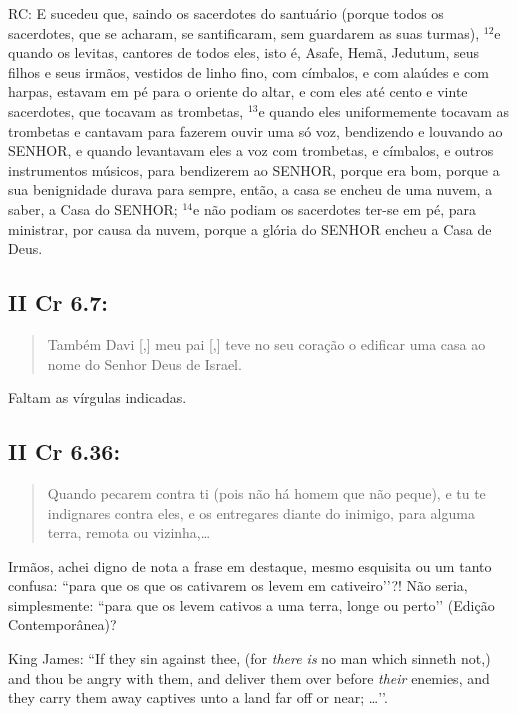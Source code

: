 RC: E sucedeu que, saindo os sacerdotes do santuário (porque todos os
sacerdotes, que se acharam, se santificaram, sem guardarem as suas
turmas), $^{\mathrm{12}}$e quando os levitas, cantores de todos eles,
isto é, Asafe, Hemã, Jedutum, seus filhos e seus irmãos, vestidos de
linho fino, com címbalos, e com alaúdes e com harpas, estavam em pé
para o oriente do altar, e com eles até cento e vinte sacerdotes, que
tocavam as trombetas, $^{\mathrm{13}}$e quando eles uniformemente
tocavam as trombetas e cantavam para fazerem ouvir uma só voz,
bendizendo e louvando ao SENHOR, e quando levantavam eles a voz com
trombetas, e címbalos, e outros instrumentos músicos, para bendizerem
ao SENHOR, porque era bom, porque a sua benignidade durava para
sempre, então, a casa se encheu de uma nuvem, a saber, a Casa do
SENHOR; $^{\mathrm{14}}$e não podiam os sacerdotes ter-se em pé, para
ministrar, por causa da nuvem, porque a glória do SENHOR encheu a Casa
de Deus.

\subsection{II Cr 6.7:}
\begin{quote}
    \small
 Também Davi [,] meu pai [,] teve no seu coração o edificar uma casa ao nome do Senhor Deus de Israel.
 \end{quote}
 
Faltam as vírgulas indicadas.

\subsection{II Cr 6.36:}
\begin{quote}
    \small
 Quando pecarem contra ti (pois não há homem que não peque), e tu te indignares contra eles, e os entregares diante do inimigo,  para alguma terra, remota ou vizinha,\ldots
 \end{quote}
 
Irmãos, achei digno de nota a frase em destaque, mesmo esquisita ou um
tanto confusa: ``para que os que os cativarem os levem em
cativeiro’’?! Não seria, simplesmente: ``para que os levem cativos a
uma terra, longe ou perto’’ (Edição Contemporânea)?

King James: ``If they sin against thee, (for \emph{there is} no man which sinneth not,) and thou be angry with them, and deliver them over before \emph{their} enemies, and they carry them away captives unto a land far off or near; \ldots’’.

